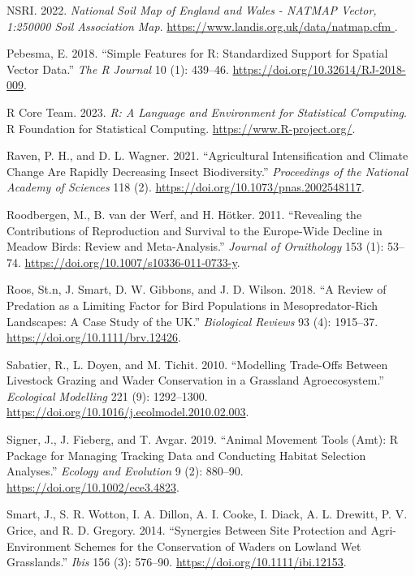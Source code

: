 \documentclass[
  12pt,
  letterpaper,
  DIV=11,
  numbers=noendperiod]{scrartcl}
\newlength{\cslhangindent}
\newenvironment{CSLReferences}[2] %
 {\begin{list}{}{%
  \setlength{\itemindent}{0pt}
  \setlength{\leftmargin}{0pt}
  \setlength{\parsep}{0pt}
  \ifodd #1
   \setlength{\leftmargin}{\cslhangindent}
   \setlength{\itemindent}{-1\cslhangindent}
  \fi
  \setlength{\itemsep}{#2\baselineskip}}}
 {\end{list}}
\begin{document}
\begin{CSLReferences}{1}{0}
NSRI. 2022. \emph{National Soil Map of England and Wales - NATMAP
Vector, 1:250000 Soil Association Map}.
\href{https://www.landis.org.uk/data/natmap.cfm\%20}{https://www.landis.org.uk/data/natmap.cfm
}.

Pebesma, E. 2018. {``{Simple Features for R: Standardized Support for
Spatial Vector Data}.''} \emph{{The R Journal}} 10 (1): 439--46.
\url{https://doi.org/10.32614/RJ-2018-009}.

R Core Team. 2023. \emph{R: A Language and Environment for Statistical
Computing}. R Foundation for Statistical Computing.
\url{https://www.R-project.org/}.

Raven, P. H., and D. L. Wagner. 2021. {``Agricultural Intensification
and Climate Change Are Rapidly Decreasing Insect Biodiversity.''}
\emph{Proceedings of the National Academy of Sciences} 118 (2).
\url{https://doi.org/10.1073/pnas.2002548117}.

Roodbergen, M., B. van der Werf, and H. Hötker. 2011. {``Revealing the
Contributions of Reproduction and Survival to the Europe-Wide Decline in
Meadow Birds: Review and Meta-Analysis.''} \emph{Journal of Ornithology}
153 (1): 53--74. \url{https://doi.org/10.1007/s10336-011-0733-y}.

Roos, St.n, J. Smart, D. W. Gibbons, and J. D. Wilson. 2018. {``A Review
of Predation as a Limiting Factor for Bird Populations in
Mesopredator{-}Rich Landscapes: A Case Study of the UK.''}
\emph{Biological Reviews} 93 (4): 1915--37.
\url{https://doi.org/10.1111/brv.12426}.

Sabatier, R., L. Doyen, and M. Tichit. 2010. {``Modelling Trade-Offs
Between Livestock Grazing and Wader Conservation in a Grassland
Agroecosystem.''} \emph{Ecological Modelling} 221 (9): 1292--1300.
\url{https://doi.org/10.1016/j.ecolmodel.2010.02.003}.

Signer, J., J. Fieberg, and T. Avgar. 2019. {``Animal Movement Tools
(Amt): R Package for Managing Tracking Data and Conducting Habitat
Selection Analyses.''} \emph{Ecology and Evolution} 9 (2): 880--90.
\url{https://doi.org/10.1002/ece3.4823}.

Smart, J., S. R. Wotton, I. A. Dillon, A. I. Cooke, I. Diack, A. L.
Drewitt, P. V. Grice, and R. D. Gregory. 2014. {``Synergies Between Site
Protection and Agri{-}Environment Schemes for the Conservation of Waders
on Lowland Wet Grasslands.''} \emph{Ibis} 156 (3): 576--90.
\url{https://doi.org/10.1111/ibi.12153}.


\end{CSLReferences}
\end{document}
